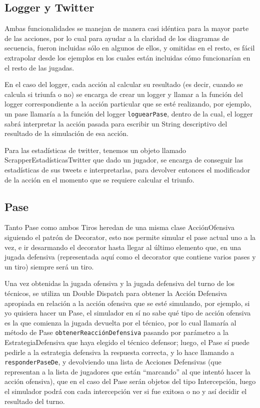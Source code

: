 \subsection{Logger y Twitter}
Ambas funcionalidades se manejan de manera casi idéntica para la mayor parte de las acciones, por lo cual para ayudar a la claridad de los diagramas de secuencia, fueron incluidas sólo en algunos de ellos, y omitidas en el resto, es fácil extrapolar desde los ejemplos en los cuales están incluidas cómo funcionarían en el resto de las jugadas.

En el caso del logger, cada acción al calcular su resultado (es decir, cuando se calcula si triunfa o no) se encarga de crear un logger y llamar a la función del logger correspondiente a la acción particular que se esté realizando, por ejemplo, un pase llamaría a la función del logger \texttt{loguearPase}, dentro de la cual, el logger sabrá interpretar la acción pasada para escribir un String descriptivo del resultado de la simulación de esa acción.

Para las estadísticas de twitter, tenemos un objeto llamado ScrapperEstadísticasTwitter que dado un jugador, se encarga de conseguir las estadísticas de sus tweets e interpretarlas, para devolver entonces el modificador de la acción en el momento que se requiere calcular el triunfo.

\subsection{Pase}

Tanto Pase como ambos Tiros heredan de una misma clase AcciónOfensiva siguiendo el patrón de Decorator, esto nos permite simular el pase actual uno a la vez, e ir desarmando el decorator hasta llegar al último elemento que, en una jugada defensiva (representada aquí como el decorator que contiene varios pases y un tiro) siempre será un tiro.

Una vez obtenidas la jugada ofensiva y la jugada defensiva del turno de los técnicos, se utiliza un Double Dispatch para obtener la Acción Defensiva apropiada en relación a la acción ofensiva que se esté simulando, por ejemplo, si yo quisiera hacer un Pase, el simulador en sí no sabe qué tipo de acción ofensiva es la que comienza la jugada devuelta por el técnico, por lo cual llamaría al método de Pase \texttt{obtenerReacciónDefensiva} pasando por parámetro a la EstrategiaDefensiva que haya elegido el técnico defensor; luego, el Pase sí puede pedirle a la estrategia defensiva la respuesta correcta, y lo hace llamando a \texttt{responderPaseDe}, y devolviendo una lista de Acciones Defensivas (que representan a la lista de jugadores que están ``marcando'' al que intentó hacer la acción ofensiva), que en el caso del Pase serán objetos del tipo Intercepción, luego el simulador podrá con cada intercepción ver si fue exitosa o no y así decidir el resultado del turno.

